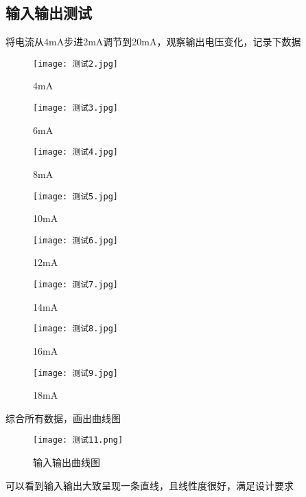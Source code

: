 \documentclass{zjureport}
\begin{document}
\subsection{输入输出测试}
将电流从4mA步进2mA调节到20mA，观察输出电压变化，记录下数据\par
\begin{figure}[H]
  \begin{minipage}{0.45\linewidth}
    \centering
    \texttt{[image: 测试2.jpg]}
    \caption{4mA}
  \end{minipage}
  \begin{minipage}{0.45\linewidth}
    \centering
    \texttt{[image: 测试3.jpg]}
    \caption{6mA}
  \end{minipage}
\end{figure}
\begin{figure}[H]
  \begin{minipage}{0.45\linewidth}
    \centering
    \texttt{[image: 测试4.jpg]}
    \caption{8mA}
  \end{minipage}
  \begin{minipage}{0.45\linewidth}
    \centering
    \texttt{[image: 测试5.jpg]}
    \caption{10mA}
  \end{minipage}
\end{figure}
\begin{figure}[H]
  \begin{minipage}{0.45\linewidth}
    \centering
    \texttt{[image: 测试6.jpg]}
    \caption{12mA}
  \end{minipage}
  \begin{minipage}{0.45\linewidth}
    \centering
    \texttt{[image: 测试7.jpg]}
    \caption{14mA}
  \end{minipage}
\end{figure}
\begin{figure}[H]
  \begin{minipage}{0.45\linewidth}
    \centering
    \texttt{[image: 测试8.jpg]}
    \caption{16mA}
  \end{minipage}
  \begin{minipage}{0.45\linewidth}
    \centering
    \texttt{[image: 测试9.jpg]}
    \caption{18mA}
  \end{minipage}
\end{figure}
综合所有数据，画出曲线图\par
\begin{figure}[H]
  \centering
  \texttt{[image: 测试11.png]}
  \caption{输入输出曲线图}
\end{figure}
可以看到输入输出大致呈现一条直线，且线性度很好，满足设计要求
\end{document}
